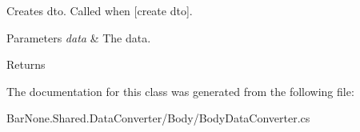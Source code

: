 Creates dto. Called when \mbox{[}create dto\mbox{]}. 


\begin{DoxyParams}{Parameters}
{\em data} & The data.\\
\hline
\end{DoxyParams}
\begin{DoxyReturn}{Returns}

\end{DoxyReturn}


The documentation for this class was generated from the following file\+:\begin{DoxyCompactItemize}
\item 
Bar\+None.\+Shared.\+Data\+Converter/\+Body/Body\+Data\+Converter.\+cs\end{DoxyCompactItemize}
